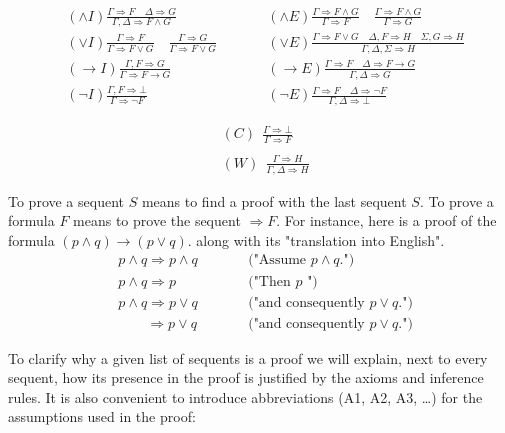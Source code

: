 \begin{align*}
& (\wedge I) \frac{ \Gamma \Rightarrow F \quad \Delta \Rightarrow G}{\Gamma, \Delta \Rightarrow F \wedge G} \qquad
& &(\wedge E) \frac{ \Gamma \Rightarrow F \wedge G}{\Gamma \Rightarrow F}
 \quad  \frac{ \Gamma \Rightarrow F \wedge G}{\Gamma \Rightarrow  G} \\
&(\vee I) \frac{ \Gamma \Rightarrow F}{ \Gamma \Rightarrow F \vee G} \quad
\frac{ \Gamma \Rightarrow G}{ \Gamma \Rightarrow F \vee G} \qquad
& &(\vee E) \frac{ \Gamma \Rightarrow F \vee G \quad \Delta, F \Rightarrow H \quad \Sigma, G \Rightarrow H} {  \Gamma, \Delta, \Sigma \Rightarrow H} \\
& (\rightarrow I) \frac{\Gamma, F \Rightarrow G}{\Gamma \Rightarrow F \rightarrow G} \qquad
& &(\rightarrow E) \frac{\Gamma \Rightarrow F \quad \Delta \Rightarrow F \rightarrow G}{\Gamma, \Delta \Rightarrow G}  \\
& (\neg I) \frac{\Gamma, F \Rightarrow \bot}{\Gamma \Rightarrow \neg F} \qquad
& &(\neg E) \frac{\Gamma \Rightarrow F \quad \Delta \Rightarrow \neg F}{\Gamma, \Delta \Rightarrow \bot}  
\end{align*}

\begin{align*}
&(C)~~\frac{\Gamma \Rightarrow \bot}{\Gamma \Rightarrow F} \\
& ~~ \\
&(W)~~\frac{\Gamma \Rightarrow H}{\Gamma, \Delta \Rightarrow H}
\end{align*}

To prove a sequent $S$ means to find a proof with the last sequent $S$. To prove a formula $F$ means to prove the sequent $\Rightarrow F$. For instance, here is a proof of the formula $(p \wedge q) \rightarrow (p \vee q)$. along with its "translation into English". 
\begin{align*}
&p \wedge q \Rightarrow p \wedge q & \qquad & \text{("Assume $p \wedge q$.")} \\
&p \wedge q \Rightarrow p          & \qquad & \text{("Then $p$            ")} \\
&p \wedge q \Rightarrow p \vee q   & \qquad & \text{("and consequently $p \vee q$.")} \\
& \qquad \Rightarrow p \vee q   & \qquad & \text{("and consequently $p \vee q$.")}
\end{align*}

To clarify why a given list of sequents is a proof we will explain, next to every sequent, how its presence in the proof is justified by the axioms and inference rules. It is also convenient to introduce abbreviations (A1, A2, A3, \ldots) for the assumptions used in the proof:

